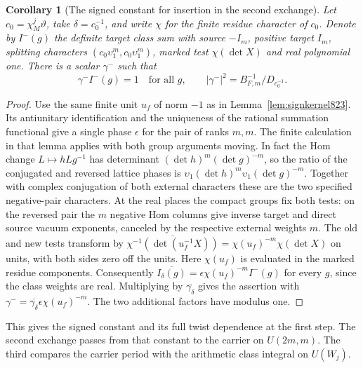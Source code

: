 \documentclass[a4paper,11pt]{article}
\newtheorem{corollary}[proposition]{Corollary}
\theoremstyle{definition}
\theoremstyle{remark}
\numberwithin{equation}{section}
\begin{document}
\begin{corollary}[The signed constant for insertion in the second exchange]
\leavevmode\label{cor:signedfirst828}
Let \(c_0=\chi_M^j\vartheta\), take \(\delta=c_0^{-1}\),
and write \(\chi\) for the finite residue character of \(c_0\).
Denote by \(I^-(g)\) the definite target class sum with source
\(-I_m\), positive target \(I_m\), splitting characters
\((c_0\upsilon_1^m,c_0\upsilon_1^m)\), marked test
\(\chi(\det X)\) and real polynomial one. There is a scalar
\(\gamma^-\) such that
\[
       \gamma^- I^-(g)=1\quad\text{for all }g,\qquad
       |\gamma^-|^2=B_{F,m}^{-1}/D_{c_0^{-1}}.
\]
\end{corollary}
\begin{proof}
Use the same finite unit \(u_f\) of norm \(-1\) as in
Lemma~\ref{lem:signkernel823}. Its antiunitary identification
and the uniqueness of the rational summation functional give
a single phase \(\epsilon\) for the pair of ranks \(m,m\).
The finite calculation in that lemma applies with both group
arguments moving. In fact the Hom change \(L\mapsto hLg^{-1}\)
has determinant \((\det h)^m(\det g)^{-m}\), so the ratio of
the conjugated and reversed lattice phases is
\(\upsilon_1(\det h)^m\upsilon_1(\det g)^{-m}\).
Together with complex conjugation of both external characters
these are the two specified negative-pair characters.
At the real places the compact groups fix both tests: on the
reversed pair the \(m\) negative Hom columns give inverse
target and direct source vacuum exponents, canceled by the
respective external weights \(m\). The old and new tests
transform by
\(\overline{\chi^{-1}(\det(u_f^{-1}X))}
=\chi(u_f)^{-m}\chi(\det X)\) on units, with both sides
zero off the units. Here \(\chi(u_f)\) is evaluated in the
marked residue components. Consequently
\(\overline{I_\delta(g)}=\epsilon\chi(u_f)^{-m}I^-(g)\)
for every \(g\), since the class weights are real.
Multiplying by \(\overline{\gamma_\delta}\) gives the assertion
with \(\gamma^-=\overline{\gamma_\delta}\epsilon\chi(u_f)^{-m}\).
The two additional factors have modulus one.
\end{proof}

This gives the signed constant and its full twist dependence
at the first step. The second exchange passes from that
constant to the carrier on \(U(2m,m)\). The third compares
the carrier period with the arithmetic class integral on
\(U(W_j)\).
\clearpage
\end{document}
